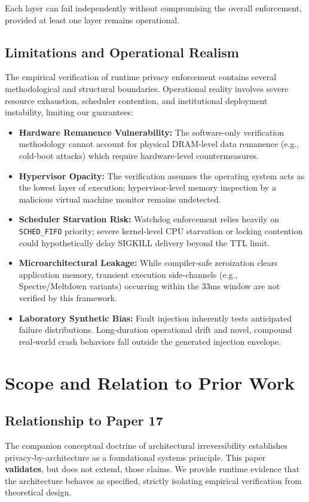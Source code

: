 \documentclass[conference]{IEEEtran}
\begin{document}
Each layer can fail independently without compromising the overall enforcement, provided at least one layer remains operational.

\subsection{Limitations and Operational Realism}
The empirical verification of runtime privacy enforcement contains several methodological and structural boundaries. Operational reality involves severe resource exhaustion, scheduler contention, and institutional deployment instability, limiting our guarantees:
\begin{itemize}
    \item \textbf{Hardware Remanence Vulnerability:} The software-only verification methodology cannot account for physical DRAM-level data remanence (e.g., cold-boot attacks) which require hardware-level countermeasures.
    \item \textbf{Hypervisor Opacity:} The verification assumes the operating system acts as the lowest layer of execution; hypervisor-level memory inspection by a malicious virtual machine monitor remains undetected.
    \item \textbf{Scheduler Starvation Risk:} Watchdog enforcement relies heavily on \texttt{SCHED\_FIFO} priority; severe kernel-level CPU starvation or locking contention could hypothetically delay SIGKILL delivery beyond the TTL limit.
    \item \textbf{Microarchitectural Leakage:} While compiler-safe zeroization clears application memory, transient execution side-channels (e.g., Spectre/Meltdown variants) occurring within the 33ms window are not verified by this framework.
    \item \textbf{Laboratory Synthetic Bias:} Fault injection inherently tests anticipated failure distributions. Long-duration operational drift and novel, compound real-world crash behaviors fall outside the generated injection envelope.
\end{itemize}

\section{Scope and Relation to Prior Work}

\subsection{Relationship to Paper 17}
The companion conceptual doctrine of architectural irreversibility establishes privacy-by-architecture as a foundational systems principle. This paper \textbf{validates}, but does not extend, those claims. We provide runtime evidence that the architecture behaves as specified, strictly isolating empirical verification from theoretical design. 
\end{document}

